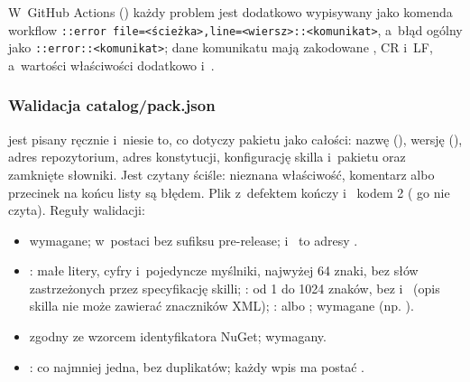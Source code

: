 W~GitHub Actions () każdy problem jest dodatkowo wypisywany
jako komenda workflow \texttt{::error file=<ścieżka>,line=<wiersz>::<komunikat>}, a~błąd
ogólny jako \texttt{::error::<komunikat>}; dane komunikatu mają zakodowane \repopath{\%},
CR i~LF, a~wartości właściwości dodatkowo \repopath{:} i~\repopath{,}.

\subsubsection{Walidacja catalog/pack.json}

 jest pisany ręcznie i~niesie to, co dotyczy pakietu jako całości:
nazwę (), wersję (), adres repozytorium, adres
konstytucji, konfigurację skilla i~pakietu oraz zamknięte słowniki. Jest czytany ściśle:
nieznana właściwość, komentarz albo przecinek na końcu listy są błędem. Plik z~defektem
kończy  i~ kodem 2 ( go nie czyta). Reguły walidacji:

\begin{itemize}
  \item {} wymagane;  w~postaci 
        bez sufiksu pre-release;  i~ to adresy
        .
  \item {}: małe litery, cyfry i~pojedyncze myślniki, najwyżej 64 znaki,
        bez słów zastrzeżonych przez specyfikację skilli; : od 1
        do 1024 znaków, bez \repopath{<} i~\repopath{>} (opis skilla nie może zawierać
        znaczników XML); :  albo
        ;  wymagane (np. ).
  \item {} zgodny ze wzorcem identyfikatora NuGet;
         wymagany.
  \item {}: co najmniej jedna, bez duplikatów; każdy wpis
         ma postać .
\end{itemize}

